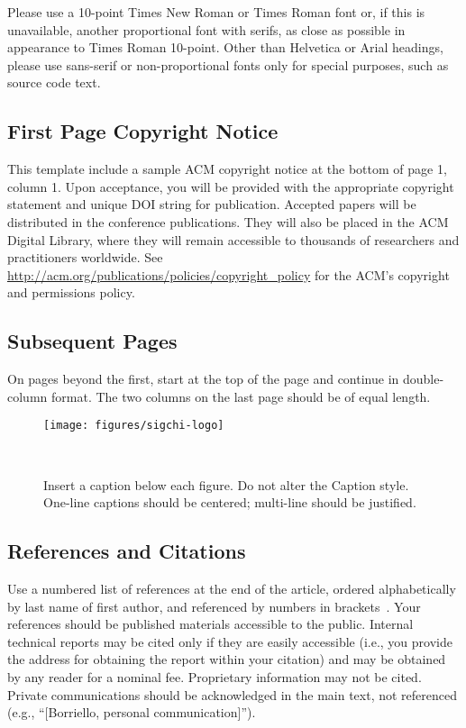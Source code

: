 \documentclass{sigchi}
\begin{document}
Please use a 10-point Times New Roman or Times Roman font or, if this
is unavailable, another proportional font with serifs, as close as
possible in appearance to Times Roman 10-point. Other than Helvetica
or Arial headings, please use sans-serif or non-proportional fonts
only for special purposes, such as source code text.

\subsection{First Page Copyright Notice}
This template include a sample ACM copyright notice at the bottom of
page 1, column 1.  Upon acceptance, you will be provided with the
appropriate copyright statement and unique DOI string for publication.
Accepted papers will be distributed in the conference
publications. They will also be placed in the ACM Digital Library,
where they will remain accessible to thousands of researchers and
practitioners worldwide. See
\url{http://acm.org/publications/policies/copyright_policy} for the
ACM's copyright and permissions policy.

\subsection{Subsequent Pages}

On pages beyond the first, start at the top of the page and continue
in double-column format.  The two columns on the last page should be
of equal length.

\begin{figure}
\centering
  \texttt{[image: figures/sigchi-logo]}
  \caption{Insert a caption below each figure. Do not alter the
    Caption style.  One-line captions should be centered; multi-line
    should be justified. }~\label{fig:figure1}
\end{figure}

\subsection{References and Citations}

Use a numbered list of references at the end of the article, ordered
alphabetically by last name of first author, and referenced by numbers
in
brackets~\cite{acm_categories,ethics,Klemmer:2002:WSC:503376.503378}.
Your references should be published materials accessible to the
public. Internal technical reports may be cited only if they are
easily accessible (i.e., you provide the address for obtaining the
report within your citation) and may be obtained by any reader for a
nominal fee. Proprietary information may not be cited. Private
communications should be acknowledged in the main text, not referenced
(e.g., ``[Borriello, personal communication]'').
\end{document}

